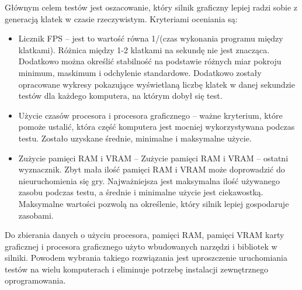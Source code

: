 \documentclass[12pt,twoside]{article}
\begin{document}
Głównym celem testów jest oszacowanie, który silnik graficzny lepiej radzi sobie
z generacją klatek w czasie rzeczywistym. Kryteriami oceniania są:

\begin{itemize}
\item Licznik FPS – jest to wartość równa 1/(czas wykonania programu między
klatkami). Różnica między 1-2 klatkami na sekundę nie jest znacząca. Dodatkowo
można określić stabilność na podstawie różnych miar pokroju minimum, maskimum i
odchylenie standardowe. Dodatkowo zostały opracowane wykresy pokazujące
wyświetlaną liczbę klatek w danej sekundzie testów dla każdego komputera, na
którym dobył się test.   
\item Użycie czasów procesora i procesora graficznego – ważne kryterium, które
pomoże ustalić, która część komputera jest mocniej wykorzystywana podczas testu.
Zostało uzyskane średnie, minimalne i maksymalne użycie. 
\item Zużycie pamięci RAM i VRAM – Zużycie pamięci RAM i VRAM – ostatni
wyznacznik. Zbyt mała ilość pamięci RAM i VRAM może doprowadzić do
nieuruchomienia się gry.  Najważniejsza jest maksymalna ilość używanego zasobu
podczas testu, a średnie i minimalne użycie jest ciekawostką. Maksymalne
wartości pozwolą na określenie, który silnik lepiej gospodaruje zasobami. 
\end{itemize}

Do zbierania danych o użyciu procesora, pamięci RAM, pamięci VRAM karty
graficznej i procesora graficznego użyto wbudowanych narzędzi i bibliotek w
silniki. Powodem wybrania takiego rozwiązania jest uproszczenie uruchomiania
testów na wielu komputerach i eliminuje potrzebę instalacji zewnętrznego
oprogramowania. 
\end{document}
